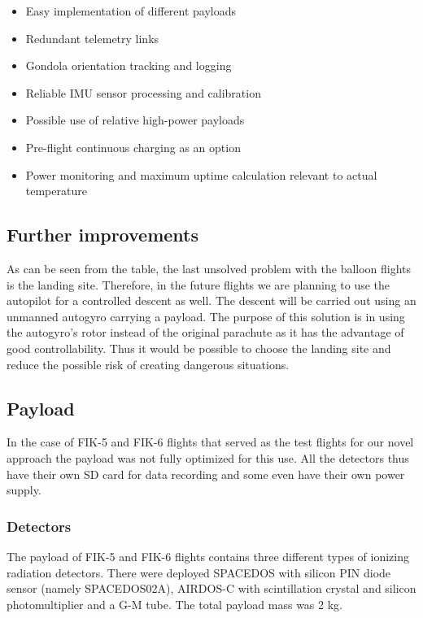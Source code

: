\documentclass{Rpd}
\begin{document}
\begin{itemize}
\item Easy implementation of different payloads
\item Redundant telemetry links
\item Gondola orientation tracking and logging
\item Reliable IMU sensor processing and calibration
\item Possible use of relative high-power payloads
\item Pre-flight continuous charging as an option
\item Power monitoring and maximum uptime calculation relevant to actual temperature
\end{itemize}


\subsection{Further improvements}

As can be seen from the table, the last unsolved problem with the balloon flights is the landing site. Therefore, in the future flights we are planning to use the autopilot for a controlled descent as well.
The descent will be carried out using an unmanned autogyro carrying a payload. The purpose of this solution is in using the autogyro’s rotor instead of the original parachute as it has the advantage of good controllability. Thus it would be possible to choose the landing site and reduce the possible risk of creating dangerous situations.

\subsection{Payload}
In the case of FIK-5 and FIK-6 flights that served as the test flights for our novel approach the payload was not fully optimized for this use. All the detectors thus have their own SD card for data recording and some even have their own power supply.


\subsubsection{Detectors}

The payload of FIK-5 and FIK-6 flights contains three different types of ionizing radiation detectors. There were deployed SPACEDOS with silicon PIN diode sensor (namely SPACEDOS02A), AIRDOS-C with scintillation crystal and silicon photomultiplier and a G-M tube. The total payload mass was 2 kg.
\end{document}
